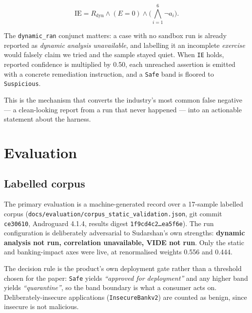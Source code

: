 \documentclass{article}
\begin{document}
\begin{equation}
\mathrm{IE} = R_{\mathrm{dyn}} \wedge (E = 0) \wedge
\Big(\textstyle\bigwedge_{i=1}^{6} \neg a_i\Big).
\label{eq:ie}
\end{equation}

The \texttt{dynamic\_ran} conjunct matters: a case with no sandbox run is
already reported as \emph{dynamic analysis unavailable}, and labelling it an
incomplete \emph{exercise} would falsely claim we tried and the sample stayed
quiet. When \texttt{IE} holds, reported confidence is multiplied by 0.50, each
unreached assertion is emitted with a concrete remediation instruction, and a
\texttt{Safe} band is floored to \texttt{Suspicious}.

This is the mechanism that converts the industry's most common false negative
--- a clean-looking report from a run that never happened --- into an actionable
statement about the harness.

\section{Evaluation}
\label{sec:eval}

\subsection{Labelled corpus}
\label{ssec:corpus}

The primary evaluation is a machine-generated record over a 17-sample labelled
corpus (\texttt{docs/evaluation/corpus\_static\_validation.json}, git commit
\texttt{ce30610}, Androguard 4.1.4, results digest
\texttt{1f9cd4c2\ldots ea5f6e}). The run configuration is deliberately
adversarial to Sudarshan's own strengths: \textbf{dynamic analysis not run,
correlation unavailable, VIDE not run}. Only the static and banking-impact axes
were live, at renormalised weights 0.556 and 0.444.

The decision rule is the product's own deployment gate rather than a threshold
chosen for the paper: \texttt{Safe} yields \emph{``approved for deployment''}
and any higher band yields \emph{``quarantine''}, so the band boundary is what a
consumer acts on. Deliberately-insecure applications (\texttt{InsecureBankv2})
are counted as benign, since insecure is not malicious.
\end{document}
